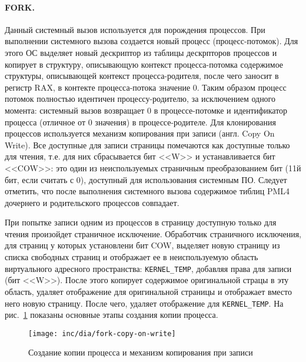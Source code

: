 \paragraph{FORK.} Данный системный вызов используется для порождения процессов. При выполнении системного
вызова создается новый процесс (процесс-потомок). Для этого ОС выделяет новый дескриптор из таблицы
дескрпторов процессов и копирует в структуру, описывающую контекст процесса-потомка содержимое структуры,
описывающей контекст процесса-родителя, после чего заносит в регистр RAX, в контекте процесса-потока значение 0.
Таким образом процесс потомок полностью идентичен процессу-родителю, за исключением одного момента: системный вызов
возвращает 0 в процессе-потомке и идентификатор процесса (отличное от 0 значения) в процессе-родителе. Для
клонирования процессов используется механизм копирования при записи (англ. Copy On Write). Все доступные для записи
страницы помечаются как доступные только для чтения, т.е. для них сбрасывается бит <<W>> и устанавливается бит <<COW>>:
это один из неиспользуемых страничным преобразованием бит (11й бит, если считать с 0), доступный для использования
системным ПО. Следует отметить, что после выполнения системного вызова содержимое тиблиц PML4 дочернего и родительского
процессов совпадает.

При попытке записи одним из процессов в страницу доступную только для чтения произойдет страничное исключение.
Обработчик страничного исключения, для страниц у которых установлени бит COW, выделяет новую страницу из списка
свободных страниц и отображает ее в неиспользуемую область виртуального адресного пространства: \texttt{KERNEL\_TEMP},
добавляя права для записи (бит <<W>>). После этого копирует содержимое оригинальной страцы в эту область, удаляет
отображение для оригинальной страницы и отображает вместо него новую страницу. После чего, удаляет отображение для
\texttt{KERNEL\_TEMP}. На рис.~\ref{fig:fork-copy-on-write} показаны основные этапы создания копии процесса.

\begin{figure}[ht!]
  \centering
  \texttt{[image: inc/dia/fork-copy-on-write]}
  \caption{Создание копии процесса и механизм копирования при записи}
  \label{fig:fork-copy-on-write}
\end{figure}

